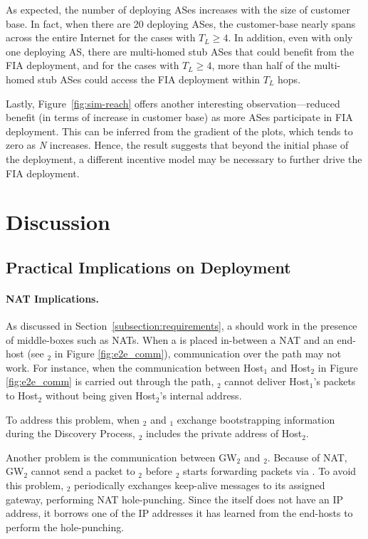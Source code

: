 As expected, the number of deploying ASes increases with the size of customer
base. In fact, when there are 20 deploying ASes, the customer-base nearly spans
across the entire Internet for the cases with $T_L\geq4$. In addition, even
with only one deploying AS, there are multi-homed stub ASes that could benefit
from the FIA deployment, and for the cases with $T_L\geq4$, more than half of
the multi-homed stub ASes could access the FIA deployment within $T_L$ hops.

Lastly, Figure~\ref{fig:sim-reach} offers another interesting
observation---reduced benefit (in terms of increase in customer base) as more
ASes participate in FIA deployment. This can be inferred from the gradient of
the plots, which tends to zero as \textit{N} increases. Hence, the result
suggests that beyond the initial phase of the deployment, a different incentive
model may be necessary to further drive the FIA deployment.

\section{Discussion}
\label{sec:discussion}
\subsection{Practical Implications on Deployment}

\paragraph{NAT Implications.} As discussed in
Section~\ref{subsection:requirements}, a \name should work in the presence of
middle-boxes such as NATs. When a \name is placed in-between a NAT and an
end-host (see \namens$_2$ in Figure \ref{fig:e2e_comm}), communication over the
\scion path may not work. For instance, when the communication between Host$_1$
and Host$_2$ in Figure \ref{fig:e2e_comm} is carried out through the \scion
path, \namens$_2$ cannot deliver Host$_1$'s packets to Host$_2$ without being
given Host$_2$'s internal address.

To address this problem, when \namens$_2$ and \namens$_1$ exchange bootstrapping
information during the \name Discovery Process, \namens$_2$ includes the private
address of Host$_2$.

Another problem is the communication between GW$_2$ and \namens$_2$. Because of
NAT, GW$_2$ cannot send a packet to \namens$_2$ before \namens$_2$ starts
forwarding packets via \scion. To avoid this problem, \namens$_2$ periodically
exchanges keep-alive messages to its assigned gateway, performing NAT
hole-punching. Since the \name itself does not have an IP address, it borrows
one of the IP addresses it has learned from the end-hosts to perform the
hole-punching.

